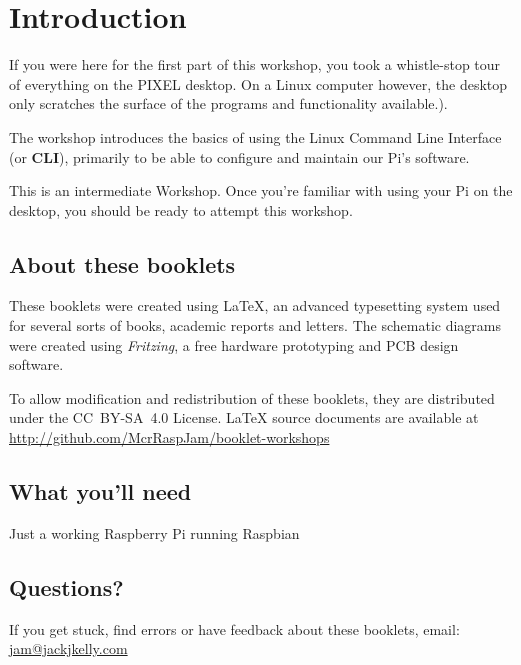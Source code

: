 \setcounter{section}{-1}
\section{Introduction}
	
	If you were here for the first part of this workshop, you took a whistle-stop tour of everything on the PIXEL desktop. On a Linux computer however, the desktop only scratches the surface of the programs and functionality available.).
	
	The workshop introduces the basics of using the Linux Command Line Interface (or \textbf{CLI}), primarily to be able to configure and maintain our Pi's software.

	This is an intermediate Workshop. Once you're familiar with using your Pi on the desktop, you should be ready to attempt this workshop.
		
	\subsection*{About these booklets}
	
	
	
		
	These booklets were created using {\selectfont \LaTeX}, an advanced typesetting system used for several sorts of books, academic reports and letters. The schematic diagrams were created using \textit{Fritzing}, a free hardware prototyping and PCB design software.
		
	To allow modification and redistribution of these booklets, they are distributed under the \hbox{CC BY-SA 4.0} License. LaTeX source documents are available at \url{http://github.com/McrRaspJam/booklet-workshops}
	
	
	\subsection*{What you'll need}
		
		Just a working Raspberry Pi running Raspbian
		
	\subsection*{Questions?}
		If you get stuck, find errors or have feedback about these booklets, email:
		\url{jam@jackjkelly.com}\label{email}